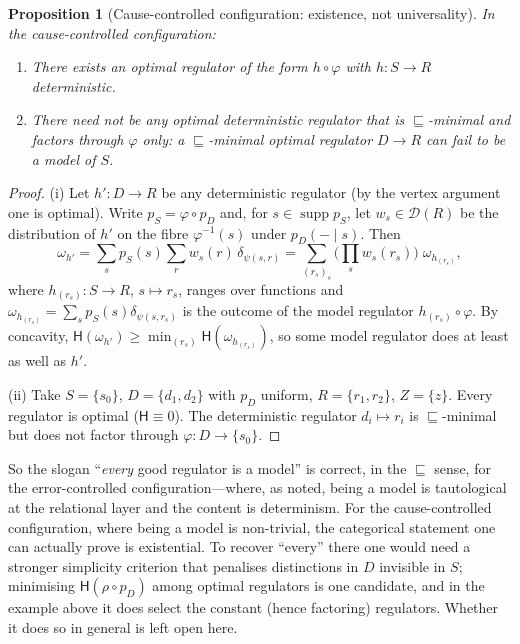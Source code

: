 \documentclass[11pt,a4paper]{article}
\newtheorem{proposition}[theorem]{Proposition}
\theoremstyle{definition}
\theoremstyle{remark}
\newcommand{\Dist}{\mathcal{D}}
\newcommand{\supp}{\operatorname{supp}}
\newcommand{\ent}{\mathsf{H}}
\newcommand{\refines}{\sqsubseteq}
\begin{document}
\begin{proposition}[Cause-controlled configuration: existence, not universality]\label{prop:config1}
In the cause-controlled configuration:
\begin{enumerate}[label=(\roman*)]
\item There exists an optimal regulator of the form $h\circ\varphi$ with $h\colon S\to R$ deterministic.
\item There need not be any optimal deterministic regulator that is $\refines$-minimal and factors through $\varphi$ only: a $\refines$-minimal optimal regulator $D\to R$ can fail to be a model of $S$.
\end{enumerate}
\end{proposition}
\begin{proof}
(i) Let $h'\colon D\to R$ be any deterministic regulator (by the vertex argument one is optimal). Write $p_S=\varphi\circ p_D$ and, for $s\in\supp p_S$, let $w_s\in\Dist(R)$ be the distribution of $h'$ on the fibre $\varphi^{-1}(s)$ under $p_D(-\mid s)$. Then
\[
\omega_{h'}=\sum_s p_S(s)\sum_r w_s(r)\,\delta_{\psi(s,r)}
=\sum_{(r_s)_s}\Big(\prod_s w_s(r_s)\Big)\;\omega_{h_{(r_s)}},
\]
where $h_{(r_s)}\colon S\to R$, $s\mapsto r_s$, ranges over functions and $\omega_{h_{(r_s)}}=\sum_s p_S(s)\delta_{\psi(s,r_s)}$ is the outcome of the model regulator $h_{(r_s)}\circ\varphi$. By concavity, $\ent(\omega_{h'})\ge\min_{(r_s)}\ent(\omega_{h_{(r_s)}})$, so some model regulator does at least as well as $h'$.

(ii) Take $S=\{s_0\}$, $D=\{d_1,d_2\}$ with $p_D$ uniform, $R=\{r_1,r_2\}$, $Z=\{z\}$. Every regulator is optimal ($\ent\equiv0$). The deterministic regulator $d_i\mapsto r_i$ is $\refines$-minimal but does not factor through $\varphi\colon D\to\{s_0\}$.
\end{proof}

So the slogan ``\emph{every} good regulator is a model'' is correct, in the
$\refines$ sense, for the error-controlled configuration---where, as noted,
being a model is tautological at the relational layer and the content is
determinism. For the cause-controlled configuration, where being a model is
non-trivial, the categorical statement one can actually prove is existential.
To recover ``every'' there one would need a stronger simplicity criterion that
penalises distinctions in $D$ invisible in $S$; minimising $\ent(\rho\circ p_D)$
among optimal regulators is one candidate, and in the example above it does
select the constant (hence factoring) regulators. Whether it does so in general
is left open here.
\end{document}
